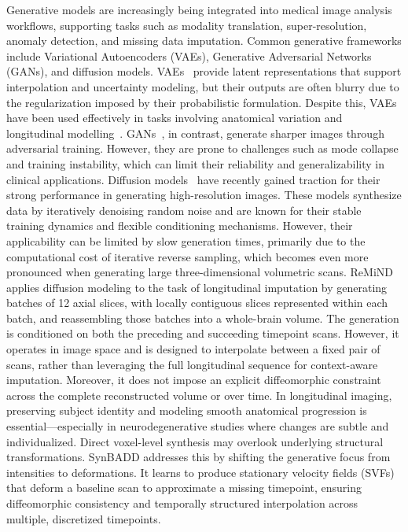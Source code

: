 Generative models are increasingly being integrated into medical image analysis workflows, supporting tasks such as modality translation, super-resolution, anomaly detection, and missing data imputation. Common generative frameworks include Variational Autoencoders (VAEs), Generative Adversarial Networks (GANs), and diffusion models. VAEs~\cite{kingma2014vae} provide latent representations that support interpolation and uncertainty modeling, but their outputs are often blurry due to the regularization imposed by their probabilistic formulation. Despite this, VAEs have been used effectively in tasks involving anatomical variation and longitudinal modelling~\cite{mcdade2018longitudinal}. GANs~\cite{goodfellow2014gan}, in contrast, generate sharper images through adversarial training. However, they are prone to challenges such as mode collapse and training instability, which can limit their reliability and generalizability in clinical applications. Diffusion models~\cite{ho2020ddpm} have recently gained traction for their strong performance in generating high-resolution images. These models synthesize data by iteratively denoising random noise and are known for their stable training dynamics and flexible conditioning mechanisms. However, their applicability can be limited by slow generation times, primarily due to the computational cost of iterative reverse sampling, which becomes even more pronounced when generating large three-dimensional volumetric scans. ReMiND~\cite{yuan2024remind} applies diffusion modeling to the task of longitudinal imputation by generating batches of 12 axial slices, with locally contiguous slices represented within each batch, and reassembling those batches into a whole-brain volume. The generation is conditioned on both the preceding and succeeding timepoint scans. However, it operates in image space and is designed to interpolate between a fixed pair of scans, rather than leveraging the full longitudinal sequence for context-aware imputation. Moreover, it does not impose an explicit diffeomorphic constraint across the complete reconstructed volume or over time. In longitudinal imaging, preserving subject identity and modeling smooth anatomical progression is essential—especially in neurodegenerative studies where changes are subtle and individualized. Direct voxel-level synthesis may overlook underlying structural transformations. SynBADD addresses this by shifting the generative focus from intensities to deformations. It learns to produce stationary velocity fields (SVFs) that deform a baseline scan to approximate a missing timepoint, ensuring diffeomorphic consistency and temporally structured interpolation across multiple, discretized timepoints.



